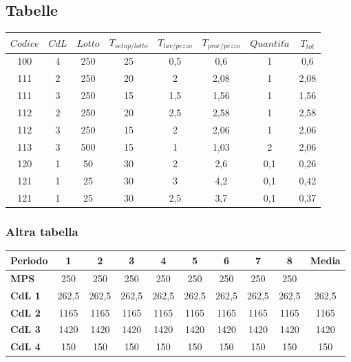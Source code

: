 \documentclass{FR16}
\begin{document}
\subsection{Tabelle}
\begin{center}
\begin{tabular}{c c c c c c c c}
\arrayrulecolor{Azzurro}
\hline
{\bfseries $Codice$} & {\bfseries $CdL$} & {\bfseries $Lotto$} & {\bfseries $T_{setup/lotto}$} & {\bfseries $T_{lav/pezzo}$} & {\bfseries $T_{proc/pezzo}$} & {\bfseries$Quantit\grave{a}$} & {\bfseries $T_{tot}$}\\
\hline
100 & 4 & 250 & 25 & 0,5 & 0,6 & 1 & 0,6\\
111 & 2 & 250 & 20 & 2 & 2,08 & 1 & 2,08 \\
111 & 3 & 250 & 15 & 1,5 & 1,56 & 1 & 1,56 \\
112 & 2 & 250 & 20 & 2,5 & 2,58 & 1 & 2,58 \\
112 & 3 & 250 & 15 & 2 & 2,06 & 1 & 2,06\\
113 & 3 & 500 & 15 & 1 & 1,03 & 2 & 2,06\\
120 & 1 & 50 & 30 & 2 & 2,6 & 0,1 & 0,26\\
121 & 1 & 25 & 30 & 3 & 4,2 & 0,1 & 0,42 \\
121 & 1 & 25 & 30 & 2,5 & 3,7 & 0,1 & 0,37 \\
\hline
\end{tabular}
\end{center}

\subsubsection{Altra tabella}
\begin{center}
\begin{tabular}{l c c c c c c c c c}
\arrayrulecolor{Azzurro}
\hline
{\bfseries Periodo} & 1 & 2 & 3 & 4 & 5 & 6 & 7 & 8 & Media\\
\hline
{\bfseries MPS} & 250 & 250 & 250 & 250 & 250 & 250 & 250 & 250 & \\
{\bfseries CdL 1} & 262,5 & 262,5 & 262,5 & 262,5 & 262,5 & 262,5 & 262,5 & 262,5 & 262,5\\
{\bfseries CdL 2} & 1165 & 1165 & 1165 & 1165 & 1165 & 1165 & 1165 & 1165 & 1165\\
{\bfseries CdL 3} & 1420 & 1420 & 1420 & 1420 & 1420 & 1420 & 1420 & 1420 & 1420\\
{\bfseries CdL 4} & 150 & 150 & 150 & 150 & 150 & 150 & 150 & 150 & 150\\
\hline
\end{tabular}
\end{center}
\end{document}
